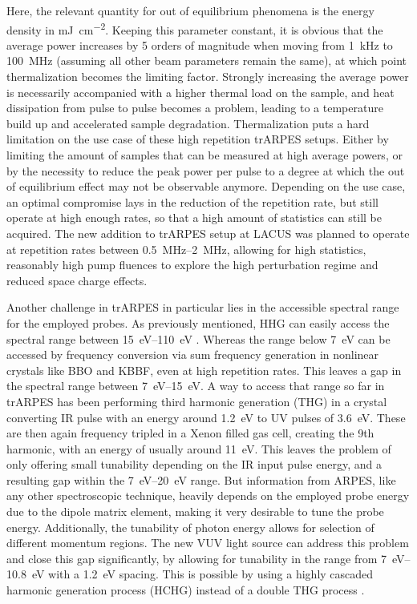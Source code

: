 Here, the relevant quantity for out of equilibrium phenomena is the energy density in \unit{\milli\joule\per\centi\meter^2}.
Keeping this parameter constant, it is obvious that the average power increases by 5 orders of magnitude when moving from \qty{1}{\kilo\hertz} to \qty{100}{\mega\hertz} (assuming all other beam parameters remain the same), at which point thermalization becomes the limiting factor.
Strongly increasing the average power is necessarily accompanied with a higher thermal load on the sample, and heat dissipation from pulse to pulse becomes a problem, leading to a temperature build up and accelerated sample degradation.
Thermalization puts a hard limitation on the use case of these high repetition trARPES setups.
Either by limiting the amount of samples that can be measured at high average powers, or by the necessity to reduce the peak power per pulse to a degree at which the out of equilibrium effect may not be observable anymore.
Depending on the use case, an optimal compromise lays in the reduction of the repetition rate, but still operate at high enough rates, so that a high amount of statistics can still be acquired.
The new addition to trARPES setup at LACUS was planned to operate at repetition rates between \qtyrange{0.5}{2}{\mega\hertz}, allowing for high statistics, reasonably high pump fluences to explore the high perturbation regime and reduced space charge effects.

Another challenge in trARPES in particular lies in the accessible spectral range for the employed probes.
As previously mentioned, HHG can easily access the spectral range between \qtyrange{15}{110}{\electronvolt} \cite{chini_coherent_2014,weissenbilder_how_2022}.
Whereas the range below \qty{7}{\electronvolt} can be accessed by frequency conversion via sum frequency generation in nonlinear crystals like BBO and KBBF, even at high repetition rates.
This leaves a gap in the spectral range between \qtyrange{7}{15}{\electronvolt}.
A way to access that range so far in trARPES has been performing third harmonic generation (THG) in a crystal converting IR pulse with an energy around \qty{1.2}{\electronvolt} to UV pulses of \qty{3.6}{\electronvolt}.
These are then again frequency tripled in a Xenon filled gas cell, creating the 9th harmonic, with an energy of usually around \qty{11}{\electronvolt}.
This leaves the problem of only offering small tunability depending on the IR input pulse energy, and a resulting gap within the \qtyrange{7}{20}{\electronvolt} range.
But information from ARPES, like any other spectroscopic technique, heavily depends on the employed probe energy due to the dipole matrix element, making it very desirable to tune the probe energy.
Additionally, the tunability of photon energy allows for selection of different momentum regions. 
The new VUV light source can address this problem and close this gap significantly, by allowing for tunability in the range from \qtyrange{7}{10.8}{\electronvolt} with a \qty{1.2}{\electronvolt} spacing.
This is possible by using a highly cascaded harmonic generation process (HCHG) instead of a double THG process \cite{couch_ultrafast_2020}.

